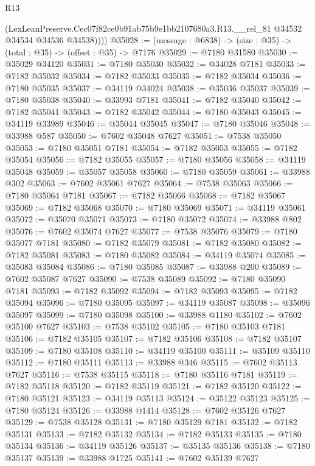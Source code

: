 \begin{lexlean}{R13}
\begin{coremodule}
          (LexLeanPreserve.Cec07f82ce0b91ab75b9e1bb2107680a3.R13.__rel_81
            @34532
            @34534
            @34536
            @34538))))
@35028 := (message : @6838) -> (size : @35) -> (total : @35) -> (offset : @35) -> @7176
@35029 := @7180 @31580
@35030 := @35029 @34120
@35031 := @7180 @35030
@35032 := @34028 @7181
@35033 := @7182 @35032
@35034 := @7182 @35033
@35035 := @7182 @35034
@35036 := @7180 @35035
@35037 := @34119 @34024
@35038 := @35036 @35037
@35039 := @7180 @35038
@35040 := @33993 @7181
@35041 := @7182 @35040
@35042 := @7182 @35041
@35043 := @7182 @35042
@35044 := @7180 @35043
@35045 := @34119 @33989
@35046 := @35044 @35045
@35047 := @7180 @35046
@35048 := @33988 @587
@35050 := @7602 @35048 @7627
@35051 := @7538 @35050
@35053 := @7180 @35051 @7181
@35054 := @7182 @35053
@35055 := @7182 @35054
@35056 := @7182 @35055
@35057 := @7180 @35056
@35058 := @34119 @35048
@35059 := @35057 @35058
@35060 := @7180 @35059
@35061 := @33988 @302
@35063 := @7602 @35061 @7627
@35064 := @7538 @35063
@35066 := @7180 @35064 @7181
@35067 := @7182 @35066
@35068 := @7182 @35067
@35069 := @7182 @35068
@35070 := @7180 @35069
@35071 := @34119 @35061
@35072 := @35070 @35071
@35073 := @7180 @35072
@35074 := @33988 @802
@35076 := @7602 @35074 @7627
@35077 := @7538 @35076
@35079 := @7180 @35077 @7181
@35080 := @7182 @35079
@35081 := @7182 @35080
@35082 := @7182 @35081
@35083 := @7180 @35082
@35084 := @34119 @35074
@35085 := @35083 @35084
@35086 := @7180 @35085
@35087 := @33988 @200
@35089 := @7602 @35087 @7627
@35090 := @7538 @35089
@35092 := @7180 @35090 @7181
@35093 := @7182 @35092
@35094 := @7182 @35093
@35095 := @7182 @35094
@35096 := @7180 @35095
@35097 := @34119 @35087
@35098 := @35096 @35097
@35099 := @7180 @35098
@35100 := @33988 @1180
@35102 := @7602 @35100 @7627
@35103 := @7538 @35102
@35105 := @7180 @35103 @7181
@35106 := @7182 @35105
@35107 := @7182 @35106
@35108 := @7182 @35107
@35109 := @7180 @35108
@35110 := @34119 @35100
@35111 := @35109 @35110
@35112 := @7180 @35111
@35113 := @33988 @346
@35115 := @7602 @35113 @7627
@35116 := @7538 @35115
@35118 := @7180 @35116 @7181
@35119 := @7182 @35118
@35120 := @7182 @35119
@35121 := @7182 @35120
@35122 := @7180 @35121
@35123 := @34119 @35113
@35124 := @35122 @35123
@35125 := @7180 @35124
@35126 := @33988 @1414
@35128 := @7602 @35126 @7627
@35129 := @7538 @35128
@35131 := @7180 @35129 @7181
@35132 := @7182 @35131
@35133 := @7182 @35132
@35134 := @7182 @35133
@35135 := @7180 @35134
@35136 := @34119 @35126
@35137 := @35135 @35136
@35138 := @7180 @35137
@35139 := @33988 @1725
@35141 := @7602 @35139 @7627

\end{coremodule}
\end{lexlean}
